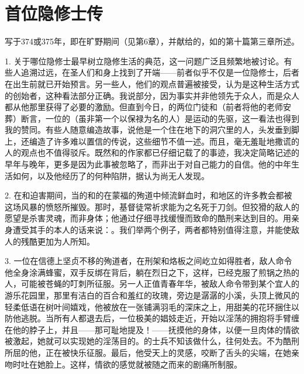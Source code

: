 
\chapter{首位隐修士传}


写于374或375年，即在旷野期间（见第6章），并献给的，如的第十篇第三章所述。\par

1. 关于哪位隐修士最早树立隐修生活的典范，这一问题广泛且频繁地被讨论。有些人追溯过远，在圣人们和身上找到了开端——前者似乎不仅是一位隐修士，后者在出生前就已开始预言。另一些人，他们的观点普遍被接受，认为是这种生活方式的创始者，这种看法部分正确。我说部分，因为事实并非他领先于众人，而是众人都从他那里获得了必要的激励。但直到今日，的两位门徒和（前者将他的老师安葬）断言，一位的（虽非第一个以保禄为名的人）是运动的先驱，这一看法也得到我的赞同。有些人随意编造故事，说他是一个住在地下的洞穴里的人，头发垂到脚上，还编造了许多难以置信的传说，这些细节不值一述。而且，毫无羞耻地撒谎的人的观点也不值得驳斥。既然和的作家都已仔细记载了的事迹，我决定简略记述的早年与晚年，更多是因为此事被忽略了，而非出于对自己能力的自信。他的中年生活如何，以及他经历了的何种陷阱，据认为尚无人发现。\par

2. 在和迫害期间，当的和的在蒙福的殉道中倾流鲜血时，和地区的许多教会都被这场风暴的愤怒所摧毁。那时，基督徒常祈求能为之名死于刀剑。但狡猾的敌人的愿望是杀害灵魂，而非身体；他通过仔细寻找缓慢而致命的酷刑来达到目的。用亲身遭受其手的本人的话来说：。我们举两个例子，两者都特别值得注意，并能使敌人的残酷更加为人所知。\par

3. 一位在信德上坚贞不移的殉道者，在刑架和烙板之间屹立如得胜者，敌人命令他全身涂满蜂蜜，双手反绑在背后，躺在烈日之下，这样，已经克服了煎锅之热的人，可能被苍蝇的叮刺所征服。另一人正值青春年华，被敌人命令带到某个宜人的游乐花园里，那里有洁白的百合和羞红的玫瑰，旁边是潺潺的小溪，头顶上微风的轻柔低语在树叶间嬉戏，他被放在一张铺满羽毛的深床之上，用甜美的花环捆住以防他逃脱。当所有人都退去后，一位极美的娼妓走近，开始以淫荡的拥抱将手臂缠在他的脖子上，并且——那可耻地提及！——抚摸他的身体，以便一旦肉体的情欲被激起，她就可以实现她的淫荡目的。的士兵不知该做什么，往何处去。不为酷刑所屈的他，正在被快乐征服。最后，他受天上的灵感，咬断了舌头的尖端，在她亲吻时吐在她脸上。这样，情欲的感觉就被随之而来的剧痛所制服。\par

